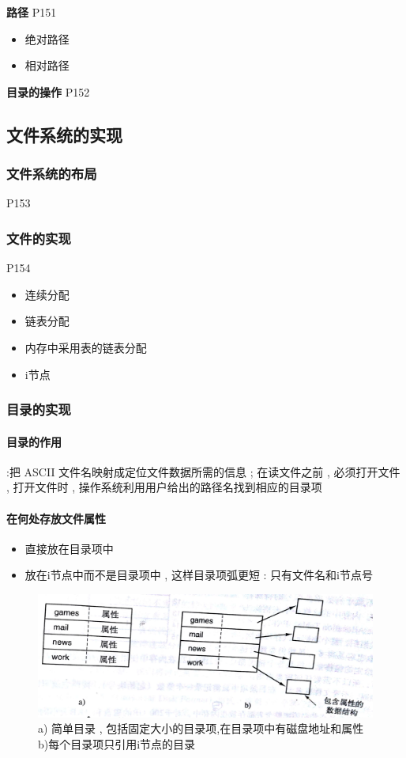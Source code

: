 \documentclass[UTF8,a4paper]{ctexart}
\begin{document}
\textbf{路径} P151
\begin{itemize}
	\item 绝对路径
	\item 相对路径
\end{itemize}

\textbf{目录的操作} P152

\subsection{文件系统的实现}

\subsubsection{文件系统的布局} P153

\subsubsection{文件的实现} P154
\begin{itemize}
	\item 连续分配
	\item 链表分配
	\item 内存中采用表的链表分配
	\item i节点
\end{itemize}

\subsubsection{目录的实现}
\paragraph{目录的作用}:把 ASCII 文件名映射成定位文件数据所需的信息 ; 在读文件之前 , 必须打开文件 , 打开文件时 , 操作系统利用用户给出的路径名找到相应的目录项

\paragraph{在何处存放文件属性}
\begin{itemize}
	\item 直接放在目录项中
	\item 放在i节点中而不是目录项中 , 这样目录项弧更短 : 只有文件名和i节点号
\end{itemize}

\begin{figure}[H]
	\centering
	\includegraphics[scale = 0.15]{assets/ModernOperatingSystems/2018-01-08-16-09-39.png}
	\caption{a) 简单目录 , 包括固定大小的目录项,在目录项中有磁盘地址和属性 b)每个目录项只引用i节点的目录}
\end{figure}
\end{document}

